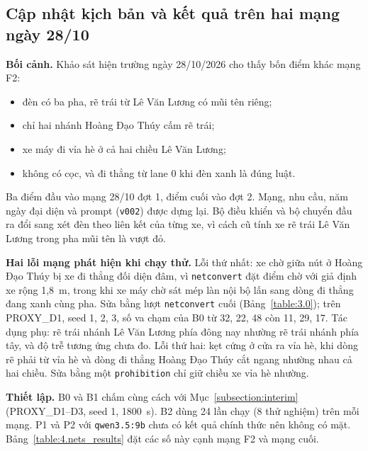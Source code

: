 \documentclass[../DoAn.tex]{subfiles}
\begin{document}
\subsection{Cập nhật kịch bản và kết quả trên hai mạng ngày 28/10}
\label{subsection:scenario_update}

\textbf{Bối cảnh.} Khảo sát hiện trường ngày 28/10/2026 cho thấy bốn điểm khác mạng F2:
\begin{itemize}
    \item đèn có ba pha, rẽ trái từ Lê Văn Lương có mũi tên riêng;
    \item chỉ hai nhánh Hoàng Đạo Thúy cấm rẽ trái;
    \item xe máy đi vỉa hè ở cả hai chiều Lê Văn Lương;
    \item không có cọc, và đi thẳng từ lane 0 khi đèn xanh là đúng luật.
\end{itemize}
Ba điểm đầu vào mạng 28/10 đợt 1, điểm cuối vào đợt 2. Mạng, nhu cầu, năm ngày đại diện và prompt (\texttt{v002}) được dựng lại. Bộ điều khiển và bộ chuyển đầu ra đổi sang xét đèn theo liên kết của từng xe, vì cách cũ tính xe rẽ trái Lê Văn Lương trong pha mũi tên là vượt đỏ.

\textbf{Hai lỗi mạng phát hiện khi chạy thử.} Lỗi thứ nhất: xe chờ giữa nút ở Hoàng Đạo Thúy bị xe đi thẳng đối diện đâm, vì \texttt{netconvert} đặt điểm chờ với giả định xe rộng 1,8~m, trong khi xe máy chờ sát mép làn nội bộ lấn sang dòng đi thẳng đang xanh cùng pha. Sửa bằng lượt \texttt{netconvert} cuối (Bảng~\ref{table:3.0}); trên PROXY\_D1, seed 1, 2, 3, số va chạm của B0 từ 32, 22, 48 còn 11, 29, 17. Tác dụng phụ: rẽ trái nhánh Lê Văn Lương phía đông nay nhường rẽ trái nhánh phía tây, và độ trễ tương ứng chưa đo. Lỗi thứ hai: kẹt cứng ở cửa ra vỉa hè, khi dòng rẽ phải từ vỉa hè và dòng đi thẳng Hoàng Đạo Thúy cắt ngang nhường nhau cả hai chiều. Sửa bằng một \texttt{prohibition} chỉ giữ chiều xe vỉa hè nhường.

\textbf{Thiết lập.} B0 và B1 chấm cùng cách với Mục~\ref{subsection:interim} (PROXY\_D1--D3, seed 1, 1800~s). B2 dùng 24 lần chạy (8 thử nghiệm) trên mỗi mạng. P1 và P2 với \texttt{qwen3.5:9b} chưa có kết quả chính thức nên không có mặt. Bảng~\ref{table:4.nets_results} đặt các số này cạnh mạng F2 và mạng cuối.
\end{document}
